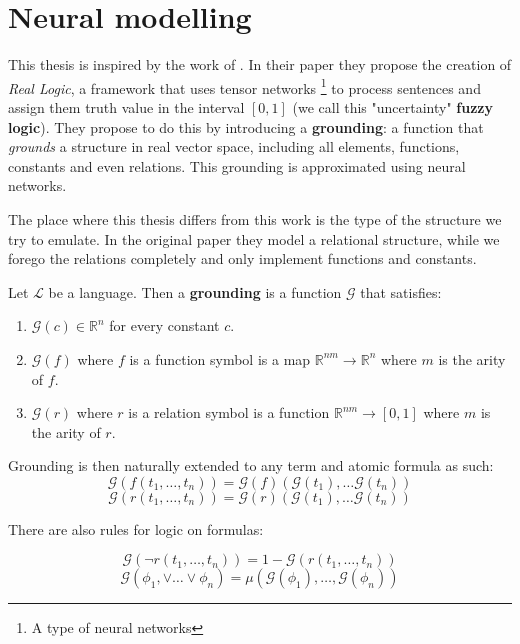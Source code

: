 \chapter{Neural modelling}

\label{chapter:implementation}
This thesis is inspired by the work of \cite{serafini}. In their paper they propose the creation of \textit{Real Logic}, a framework that uses tensor networks \footnote{A type of neural networks} to process sentences and assign them truth value in the interval $[0,1]$ (we call this "uncertainty" \textbf{fuzzy logic}). They propose to do this by introducing a \textbf{grounding}: a function that \textit{grounds} a structure in real vector space, including all elements, functions, constants and even relations. This grounding is approximated using neural networks. 

The place where this thesis differs from this work is the type of the structure we try to emulate. In the original paper they model a relational structure, while we forego the relations completely and only implement functions and constants.

\begin{defn}
\label{def:grounding}
	Let $\mathcal{L}$ be a language. Then a \textbf{grounding} is a function $\mathcal{G}$ that satisfies:
	\begin{enumerate}
		\item $\mathcal{G}(c)\in \mathbb{R}^n$ for every constant $c$.
		\item $\mathcal{G}(f)$ where $f$ is a function symbol is a map $\mathbb{R}^{nm}\rightarrow \mathbb{R}^n$ where $m$ is the arity of $f$.
		\item $\mathcal{G}(r)$ where $r$ is a relation symbol is a function $\mathbb{R}^{nm}\rightarrow [0,1]$ where $m$ is the arity of $r$.
	\end{enumerate}
\end{defn}

Grounding is then naturally extended to any term and atomic formula as such:
$$\mathcal{G}(f(t_1,\dots,t_n))=\mathcal{G}(f)(\mathcal{G}(t_1),\dots\mathcal{G}(t_n))$$
$$\mathcal{G}(r(t_1,\dots,t_n))=\mathcal{G}(r)(\mathcal{G}(t_1),\dots\mathcal{G}(t_n))$$

There are also rules for logic on formulas:

$$\mathcal{G}(\neg r(t_1,\dots,t_n))=1-\mathcal{G}(r(t_1,\dots,t_n))$$
$$\mathcal{G}(\phi_1,\vee\dots \vee\phi_n)=\mu(\mathcal{G}(\phi_1),\dots,\mathcal{G}(\phi_n))$$

